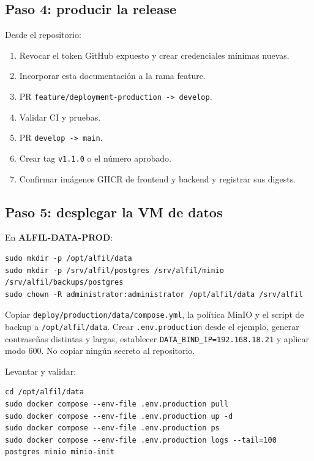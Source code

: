 \documentclass[11pt,a4paper]{article}
\newcommand{\code}[1]{\nolinkurl{#1}}
\begin{document}
\subsection{Paso 4: producir la release}

Desde el repositorio:

\begin{enumerate}
  \item Revocar el token GitHub expuesto y crear credenciales mínimas nuevas.
  \item Incorporar esta documentación a la rama feature.
  \item PR \code{feature/deployment-production -> develop}.
  \item Validar CI y pruebas.
  \item PR \code{develop -> main}.
  \item Crear tag \code{v1.1.0} o el número aprobado.
  \item Confirmar imágenes GHCR de frontend y backend y registrar sus digests.
\end{enumerate}

\subsection{Paso 5: desplegar la VM de datos}

En \textbf{ALFIL-DATA-PROD}:

\begin{lstlisting}
sudo mkdir -p /opt/alfil/data
sudo mkdir -p /srv/alfil/postgres /srv/alfil/minio /srv/alfil/backups/postgres
sudo chown -R administrator:administrator /opt/alfil/data /srv/alfil
\end{lstlisting}

Copiar \code{deploy/production/data/compose.yml}, la política MinIO y el script de backup a \code{/opt/alfil/data}. Crear \code{.env.production} desde el ejemplo, generar contraseñas distintas y largas, establecer \code{DATA_BIND_IP=192.168.18.21} y aplicar modo 600. No copiar ningún secreto al repositorio.

Levantar y validar:

\begin{lstlisting}
cd /opt/alfil/data
sudo docker compose --env-file .env.production pull
sudo docker compose --env-file .env.production up -d
sudo docker compose --env-file .env.production ps
sudo docker compose --env-file .env.production logs --tail=100 postgres minio minio-init
\end{lstlisting}
\end{document}
